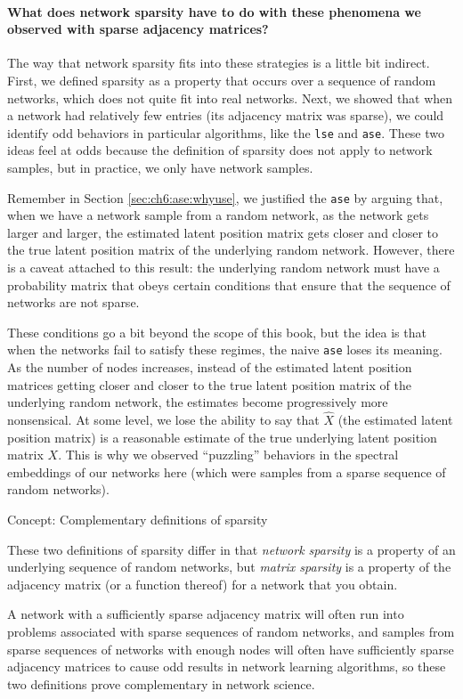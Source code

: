 \paragraph*{What does network sparsity have to do with these phenomena we observed with sparse adjacency matrices?}

The way that network sparsity fits into these strategies is a little bit indirect. First, we defined sparsity as a property that occurs over a sequence of random networks, which does not quite fit into real networks. Next, we showed that when a network had relatively few entries (its adjacency matrix was sparse), we could identify odd behaviors in particular algorithms, like the \texttt{lse} and \texttt{ase}. These two ideas feel at odds because the definition of sparsity does not apply to network samples, but in practice, we only have network samples.

Remember in Section \ref{sec:ch6:ase:whyuse}, we justified the \texttt{ase} by arguing that, when we have a network sample from a random network, as the network gets larger and larger, the estimated latent position matrix gets closer and closer to the true latent position matrix of the underlying random network. However, there is a caveat attached to this result: the underlying random network must have a probability matrix that obeys certain conditions \cite{Athreya2017Jan,Krzakala2013Dec} that ensure that the sequence of networks are not sparse. 

These conditions go a bit beyond the scope of this book, but the idea is that when the networks fail to satisfy these regimes, the naive \texttt{ase} loses its meaning. As the number of nodes increases, instead of the estimated latent position matrices getting closer and closer to the true latent position matrix of the underlying random network, the estimates become progressively more nonsensical. At some level, we lose the ability to say that $\hat X$ (the estimated latent position matrix) is a reasonable estimate of the true underlying latent position matrix $X$. This is why we observed ``puzzling'' behaviors in the spectral embeddings of our networks here (which were samples from a sparse sequence of random networks). 

\begin{floatingbox}[h]\caption{Concept: Complementary definitions of sparsity}
These two definitions of sparsity differ in that \textit{network sparsity} is a property of an underlying sequence of random networks, but \textit{matrix sparsity} is a property of the adjacency matrix (or a function thereof) for a network that you obtain. 

A network with a sufficiently sparse adjacency matrix will often run into problems associated with sparse sequences of random networks, and samples from sparse sequences of networks with enough nodes will often have sufficiently sparse adjacency matrices to cause odd results in network learning algorithms, so these two definitions prove complementary in network science.
\end{floatingbox}

\newpage